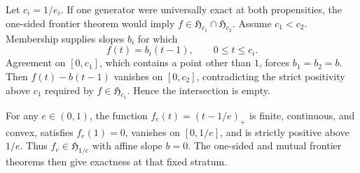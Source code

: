 Let \(c_i=1/e_i\).  If one generator were universally exact at both propensities, the one-sided frontier theorem would imply \(f\in\mathfrak H_{c_1}\cap\mathfrak H_{c_2}\).  Assume \(c_1<c_2\).  Membership supplies slopes \(b_i\) for which
\[
 f(t)=b_i(t-1),\qquad 0\le t\le c_i.
\]
Agreement on \([0,c_1]\), which contains a point other than \(1\), forces \(b_1=b_2=b\).  Then \(f(t)-b(t-1)\) vanishes on \([0,c_2]\), contradicting the strict positivity above \(c_1\) required by \(f\in\mathfrak H_{c_1}\).  Hence the intersection is empty.

For any \(e\in(0,1)\), the function \(f_e(t)=(t-1/e)_+\) is finite, continuous, and convex, satisfies \(f_e(1)=0\), vanishes on \([0,1/e]\), and is strictly positive above \(1/e\).  Thus \(f_e\in\mathfrak H_{1/e}\) with affine slope \(b=0\).  The one-sided and mutual frontier theorems then give exactness at that fixed stratum.